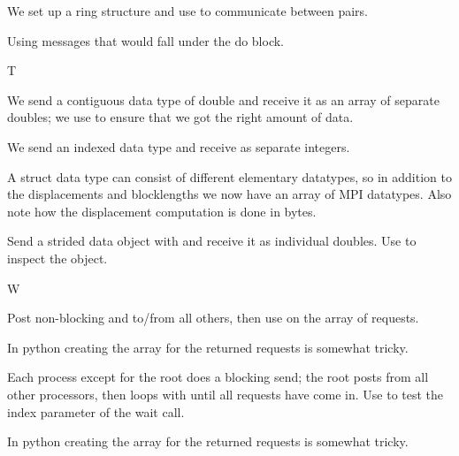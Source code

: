 
We set up a ring structure and use  to communicate
between pairs.
%


Using  messages that would fall under the
 do block.
%

 {T}


We send a contiguous data type of double and receive it as an array of
separate doubles; we use  to ensure that
we got the right amount of data.
%


We send an indexed data type and receive as separate integers.
%
%


A struct data type can consist of different elementary datatypes, so
in addition to the displacements and blocklengths we now have an array
of MPI datatypes. Also note how the displacement computation is done
in bytes.
%


Send a strided data object with  and receive it as
individual doubles. Use  to inspect the
 object.
%

 {W}


Post non-blocking  and
 to/from all others, then use 
on the array of requests.
%

In python creating the array for the returned requests is somewhat
tricky.
%


Each process except for the root does a blocking send; the root
posts  from all other processors, then loops
with  until all requests have come in. Use
 to test the index parameter of the wait
call.
%

In python creating the array for the returned requests is somewhat
tricky.
%

